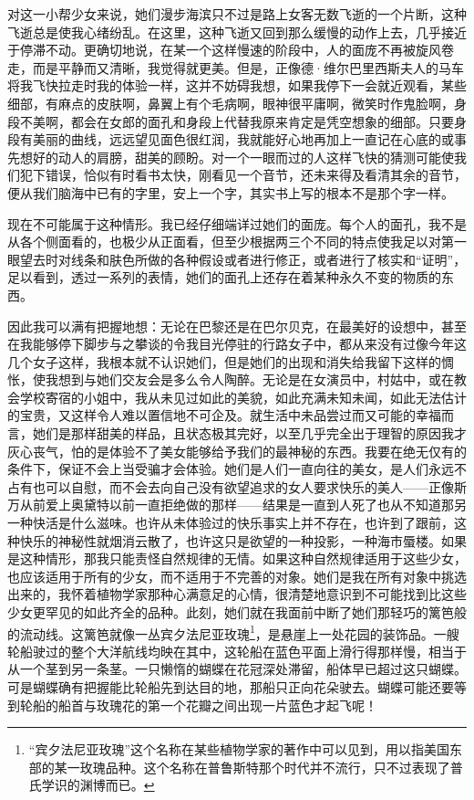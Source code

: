 \par 对这一小帮少女来说，她们漫步海滨只不过是路上女客无数飞逝的一个片断，这种飞逝总是使我心绪纷乱。在这里，这种飞逝又回到那么缓慢的动作上去，几乎接近于停滞不动。更确切地说，在某一个这样慢速的阶段中，人的面庞不再被旋风卷走，而是平静而又清晰，我觉得就更美。但是，正像德·维尔巴里西斯夫人的马车将我飞快拉走时我的体验一样，这并不妨碍我想，如果我停下一会就近观看，某些细部，有麻点的皮肤啊，鼻翼上有个毛病啊，眼神很平庸啊，微笑时作鬼脸啊，身段不美啊，都会在女郎的面孔和身段上代替我原来肯定是凭空想象的细部。只要身段有美丽的曲线，远远望见面色很红润，我就能好心地再加上一直记在心底的或事先想好的动人的肩膀，甜美的顾盼。对一个一眼而过的人这样飞快的猜测可能使我们犯下错误，恰似有时看书太快，刚看见一个音节，还未来得及看清其余的音节，便从我们脑海中已有的字里，安上一个字，其实书上写的根本不是那个字一样。
\par 现在不可能属于这种情形。我已经仔细端详过她们的面庞。每个人的面孔，我不是从各个侧面看的，也极少从正面看，但至少根据两三个不同的特点使我足以对第一眼望去时对线条和肤色所做的各种假设或者进行修正，或者进行了核实和“证明”，足以看到，透过一系列的表情，她们的面孔上还存在着某种永久不变的物质的东西。
\par 因此我可以满有把握地想：无论在巴黎还是在巴尔贝克，在最美好的设想中，甚至在我能够停下脚步与之攀谈的令我目光停驻的行路女子中，都从来没有过像今年这几个女子这样，我根本就不认识她们，但是她们的出现和消失给我留下这样的惆怅，使我想到与她们交友会是多么令人陶醉。无论是在女演员中，村姑中，或在教会学校寄宿的小姐中，我从未见过如此的美貌，如此充满未知未闻，如此无法估计的宝贵，又这样令人难以置信地不可企及。就生活中未品尝过而又可能的幸福而言，她们是那样甜美的样品，且状态极其完好，以至几乎完全出于理智的原因我才灰心丧气，怕的是体验不了美女能够给予我们的最神秘的东西。我要在绝无仅有的条件下，保证不会上当受骗才会体验。她们是人们一直向往的美女，是人们永远不占有也可以自慰，而不会去向自己没有欲望追求的女人要求快乐的美人——正像斯万从前爱上奥黛特以前一直拒绝做的那样——结果是一直到人死了也从不知道那另一种快活是什么滋味。也许从未体验过的快乐事实上并不存在，也许到了跟前，这种快乐的神秘性就烟消云散了，也许这只是欲望的一种投影，一种海市蜃楼。如果是这种情形，那我只能责怪自然规律的无情。如果这种自然规律适用于这些少女，也应该适用于所有的少女，而不适用于不完善的对象。她们是我在所有对象中挑选出来的，我怀着植物学家那种心满意足的心情，很清楚地意识到不可能找到比这些少女更罕见的如此齐全的品种。此刻，她们就在我面前中断了她们那轻巧的篱笆般的流动线。这篱笆就像一丛宾夕法尼亚玫瑰\footnote{“宾夕法尼亚玫瑰”这个名称在某些植物学家的著作中可以见到，用以指美国东部的某一玫瑰品种。这个名称在普鲁斯特那个时代并不流行，只不过表现了普氏学识的渊博而已。}，是悬崖上一处花园的装饰品。一艘轮船驶过的整个大洋航线均映在其中，这轮船在蓝色平面上滑行得那样慢，相当于从一个茎到另一条茎。一只懒惰的蝴蝶在花冠深处滞留，船体早已超过这只蝴蝶。可是蝴蝶确有把握能比轮船先到达目的地，那船只正向花朵驶去。蝴蝶可能还要等到轮船的船首与玫瑰花的第一个花瓣之间出现一片蓝色才起飞呢！
